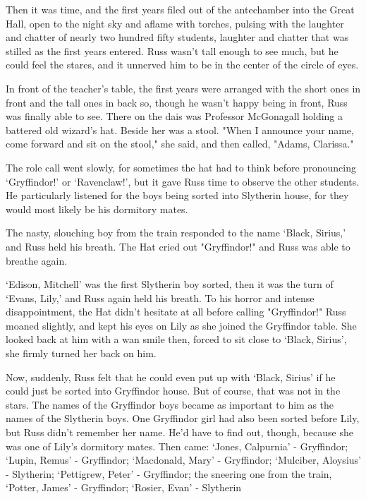 Then it was time, and the first years filed out of the antechamber into the Great Hall, open to the night sky and aflame with torches, pulsing with the laughter and chatter of nearly two hundred fifty students, laughter and chatter that was stilled as the first years entered. Russ wasn't tall enough to see much, but he could feel the stares, and it unnerved him to be in the center of the circle of eyes.

In front of the teacher's table, the first years were arranged with the short ones in front and the tall ones in back so, though he wasn't happy being in front, Russ was finally able to see. There on the dais was Professor McGonagall holding a battered old wizard's hat. Beside her was a stool. "When I announce your name, come forward and sit on the stool," she said, and then called, "Adams, Clarissa."

The role call went slowly, for sometimes the hat had to think before pronouncing `Gryffindor!' or `Ravenclaw!', but it gave Russ time to observe the other students. He particularly listened for the boys being sorted into Slytherin house, for they would most likely be his dormitory mates.

The nasty, slouching boy from the train responded to the name `Black, Sirius,' and Russ held his breath. The Hat cried out "Gryffindor!" and Russ was able to breathe again.

`Edison, Mitchell' was the first Slytherin boy sorted, then it was the turn of `Evans, Lily,' and Russ again held his breath. To his horror and intense disappointment, the Hat didn't hesitate at all before calling "Gryffindor!" Russ moaned slightly, and kept his eyes on Lily as she joined the Gryffindor table. She looked back at him with a wan smile then, forced to sit close to `Black, Sirius', she firmly turned her back on him.

Now, suddenly, Russ felt that he could even put up with `Black, Sirius' if he could just be sorted into Gryffindor house. But of course, that was not in the stars. The names of the Gryffindor boys became as important to him as the names of the Slytherin boys. One Gryffindor girl had also been sorted before Lily, but Russ didn't remember her name. He'd have to find out, though, because she was one of Lily's dormitory mates. Then came: `Jones, Calpurnia' - Gryffindor; `Lupin, Remus' - Gryffindor; `Macdonald, Mary' - Gryffindor; `Mulciber, Aloysius' - Slytherin; `Pettigrew, Peter' - Gryffindor; the sneering one from the train, `Potter, James' - Gryffindor; `Rosier, Evan' - Slytherin{\el}

